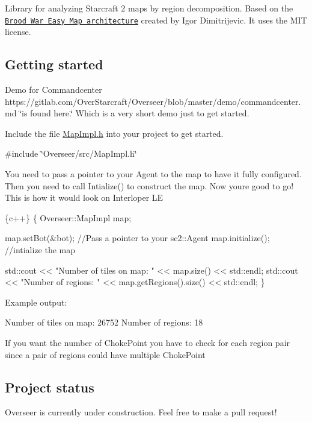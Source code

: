 

Library for analyzing Starcraft 2 maps by region decomposition. Based on the \href{http://bwem.sourceforge.net/}{\tt Brood War Easy Map architecture} created by Igor Dimitrijevic. It uses the M\+IT license.

\subsection*{Getting started}

Demo for Commandcenter https\+://gitlab.com/\+Over\+Starcraft/\+Overseer/blob/master/demo/commandcenter.\+md \char`\"{}is found here.\char`\"{} Which is a very short demo just to get started.

Include the file {\ttfamily \hyperlink{MapImpl_8h_source}{Map\+Impl.\+h}} into your project to get started.

{\ttfamily \#include \char`\"{}\+Overseer/src/\+Map\+Impl.\+h\char`\"{}}

You need to pass a pointer to your Agent to the map to have it fully configured. Then you need to call {\ttfamily Intialize()} to construct the map. Now you\textquotesingle{}re good to go! This is how it would look on Interloper LE


\begin{DoxyCode}
\{c++\}
\{
    Overseer::MapImpl map;

    map.setBot(&bot); //Pass a pointer to your sc2::Agent
    map.initialize(); //intialize the map

    std::cout << "Number of tiles on map: " << map.size() << std::endl;
    std::cout << "Number of regions: " << map.getRegions().size() << std::endl;
\}
\end{DoxyCode}


Example output\+:


\begin{DoxyCode}
Number of tiles on map: 26752
Number of regions: 18
\end{DoxyCode}


If you want the number of {\ttfamily Choke\+Point} you have to check for each region pair since a pair of regions could have multiple {\ttfamily Choke\+Point}

\subsection*{Project status}

Overseer is currently under construction. Feel free to make a pull request!

